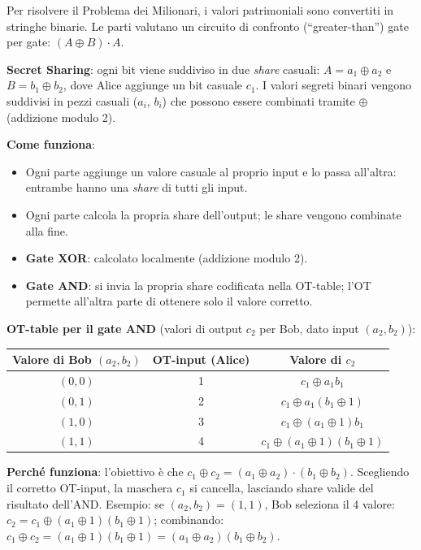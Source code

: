 \documentclass[a4paper,11pt]{article}
\begin{document}
\begin{esempio}
Per risolvere il Problema dei Milionari, i valori patrimoniali sono convertiti in stringhe binarie. Le parti valutano un circuito di confronto (``greater-than'') gate per gate: $(A \oplus B) \cdot A$.

\textbf{Secret Sharing}: ogni bit viene suddiviso in due \emph{share} casuali:
$A = a_1 \oplus a_2$ e $B = b_1 \oplus b_2$, dove Alice aggiunge un bit casuale $c_1$.
I valori segreti binari vengono suddivisi in pezzi casuali ($a_i$, $b_i$) che possono essere combinati tramite $\oplus$ (addizione modulo 2).

\textbf{Come funziona}:
\begin{itemize}
  \item Ogni parte aggiunge un valore casuale al proprio input e lo passa all'altra: entrambe hanno una \emph{share} di tutti gli input.
  \item Ogni parte calcola la propria share dell'output; le share vengono combinate alla fine.
  \item \textbf{Gate XOR}: calcolato localmente (addizione modulo 2).
  \item \textbf{Gate AND}: si invia la propria share codificata nella OT-table; l'OT permette all'altra parte di ottenere solo il valore corretto.
\end{itemize}

\textbf{OT-table per il gate AND} (valori di output $c_2$ per Bob, dato input $(a_2, b_2)$):
\begin{center}
\begin{tabular}{ccc}
\toprule
Valore di Bob $(a_2, b_2)$ & OT-input (Alice) & Valore di $c_2$ \\
\midrule
$(0,0)$ & 1 & $c_1 \oplus a_1 b_1$ \\
$(0,1)$ & 2 & $c_1 \oplus a_1(b_1 \oplus 1)$ \\
$(1,0)$ & 3 & $c_1 \oplus (a_1 \oplus 1)b_1$ \\
$(1,1)$ & 4 & $c_1 \oplus (a_1 \oplus 1)(b_1 \oplus 1)$ \\
\bottomrule
\end{tabular}
\end{center}

\textbf{Perch\'{e} funziona}: l'obiettivo \`{e} che $c_1 \oplus c_2 = (a_1 \oplus a_2) \cdot (b_1 \oplus b_2)$. Scegliendo il corretto OT-input, la maschera $c_1$ si cancella, lasciando share valide del risultato dell'AND. Esempio: se $(a_2,b_2)=(1,1)$, Bob seleziona il 4\textordmasculine{} valore: $c_2 = c_1 \oplus (a_1 \oplus 1)(b_1 \oplus 1)$; combinando: $c_1 \oplus c_2 = (a_1 \oplus 1)(b_1 \oplus 1) = (a_1 \oplus a_2)(b_1 \oplus b_2)$.
\end{esempio}
\end{document}
